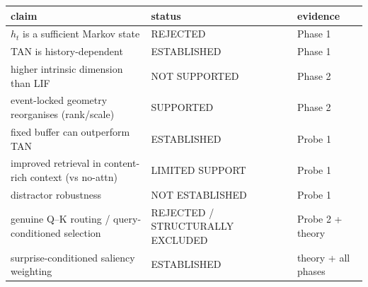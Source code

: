 \begingroup\setlength{\tabcolsep}{3pt}\begin{tabular}{p{7.7cm}p{4.3cm}p{2.5cm}}
\toprule
claim & status & evidence \\
\midrule
$h_t$ is a sufficient Markov state & REJECTED & Phase 1 \\
TAN is history-dependent & ESTABLISHED & Phase 1 \\
higher intrinsic dimension than LIF & NOT SUPPORTED & Phase 2 \\
event-locked geometry reorganises (rank/scale) & SUPPORTED & Phase 2 \\
fixed buffer can outperform TAN & ESTABLISHED & Probe 1 \\
improved retrieval in content-rich context (vs no-attn) & LIMITED SUPPORT & Probe 1 \\
distractor robustness & NOT ESTABLISHED & Probe 1 \\
genuine Q--K routing / query-conditioned selection & REJECTED / STRUCTURALLY EXCLUDED & Probe 2 + theory \\
surprise-conditioned saliency weighting & ESTABLISHED & theory + all phases \\
\bottomrule
\end{tabular}\endgroup
